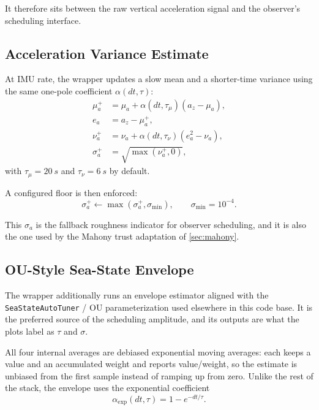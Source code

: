 \documentclass[conference]{IEEEtran}
\begin{document}
    It therefore sits between the raw vertical acceleration signal and the
    observer's scheduling interface.

    \subsection{Acceleration Variance Estimate}

    At IMU rate, the wrapper updates a slow mean and a shorter-time variance
    using the same one-pole coefficient \(\alpha(dt,\tau)\):
    \begin{align}
        \mu_a^{+} &= \mu_a + \alpha(dt,\tau_\mu)(a_z-\mu_a),\\
        e_a &= a_z - \mu_a^{+},\\
        \nu_a^{+} &= \nu_a + \alpha(dt,\tau_\nu)(e_a^2 - \nu_a),\\
        \sigma_a^{+} &= \sqrt{\max(\nu_a^{+},0)},
    \end{align}
    with \(\tau_\mu = \SI{20}{s}\) and \(\tau_\nu = \SI{6}{s}\) by default.

    A configured floor is then enforced:
    \begin{equation}
        \sigma_a^{+} \leftarrow \max(\sigma_a^{+}, \sigma_{\min}),
        \qquad \sigma_{\min} = 10^{-4}.
    \end{equation}

    This \(\sigma_a\) is the fallback roughness indicator for observer
    scheduling, and it is also the one used by the Mahony trust adaptation of
    \cref{sec:mahony}.

    \subsection{OU-Style Sea-State Envelope}\label{sec:envelope}

    The wrapper additionally runs an envelope estimator aligned with the
    \texttt{SeaStateAutoTuner} / OU parameterization used elsewhere in this code
    base. It is the preferred source of the scheduling amplitude, and its
    outputs are what the plots label as \(\tau\) and \(\sigma\).

    All four internal averages are debiased exponential moving averages: each
    keeps a value and an accumulated weight and reports value/weight, so the
    estimate is unbiased from the first sample instead of ramping up from zero.
    Unlike the rest of the stack, the envelope uses the exponential coefficient
    \begin{equation}
        \alpha_{\exp}(dt,\tau) = 1 - e^{-dt/\tau}.
    \end{equation}
\end{document}
